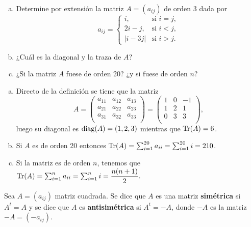 \begin{ejem}
    \begin{enumerate}[(a)]
        \item Determine por extensi\'on la matriz $A=(a_{ij})$ de orden 3 dada por
        \[a_{ij}=\begin{cases}
			i, & \text{si $i=j$,}\\
            2i-j, & \text{si $i<j$},\\
            |i-3j| & \text{si $i>j$}.
		 \end{cases}\]
		 \item ¿Cuál es la diagonal y la traza de $A$?
        \item ¿Si la matriz $A$ fuese de orden 20? ¿y si fuese de orden $n$?
    \end{enumerate}
\end{ejem}
\begin{sol}
\begin{enumerate}[(a)]
    \item Directo de la definici\'on se tiene que la matriz
    \[A=\begin{pmatrix}
    a_{11} & a_{12} & a_{13}\\
    a_{21} & a_{22} & a_{23}\\
    a_{31}& a_{32} & a_{33}\\
    \end{pmatrix}=\begin{pmatrix}
    1 & 0 & -1\\
    1 & 2 & 1\\
    0& 3 & 3\\
    \end{pmatrix},\]
    luego su diagonal es $\operatorname{diag}(A)=(1,2,3)$ mientras que $\operatorname{Tr}(A)=6$.
    \item Si $A$ es de orden 20 entonces $\operatorname{Tr}(A) =\sum_{i=1}^{20} a_{ii}=\sum_{i=1}^{20} i=210$.
    \item Si la matriz es de orden $n$, tenemos que $\operatorname{Tr}(A) =\sum_{i=1}^{n} a_{ii}=\sum_{i=1}^{n} i=\dfrac{n(n+1)}{2}.$
\end{enumerate}
\end{sol}
\begin{defin}
Sea $A = (a_{i j})$ matriz cuadrada. Se dice que $A$ es una matriz \textbf{simétrica} si
$A^t = A$ y se dice que $A$ es \textbf{antisimétrica} si $A^t = -A$, donde $-A$ es la matriz
$-A = (-a_{i j})$.
\end{defin}


